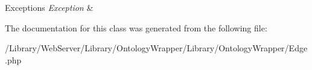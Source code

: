 \begin{DoxyExceptions}{Exceptions}
{\em Exception} & \\
\hline
\end{DoxyExceptions}


The documentation for this class was generated from the following file\-:\begin{DoxyCompactItemize}
\item 
/\-Library/\-Web\-Server/\-Library/\-Ontology\-Wrapper/\-Library/\-Ontology\-Wrapper/Edge.\-php\end{DoxyCompactItemize}
